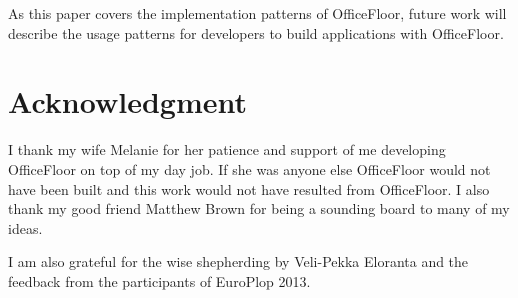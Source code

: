 \documentclass[prodmode]{style/acmlarge}
\begin{document}
As this paper covers the implementation patterns of OfficeFloor, future work
will describe the usage patterns for developers to build applications with
OfficeFloor.



\section*{Acknowledgment} 

I thank my wife Melanie for her patience and support
of me developing OfficeFloor on top of my day job.  If she was anyone else
OfficeFloor would not have been built and this work would not have resulted from
OfficeFloor.  I also thank my good friend Matthew Brown for being a sounding
board to many of my ideas.

I am also grateful for the wise shepherding by Veli-Pekka Eloranta and the
feedback from the participants of EuroPlop 2013.




\end{document}
